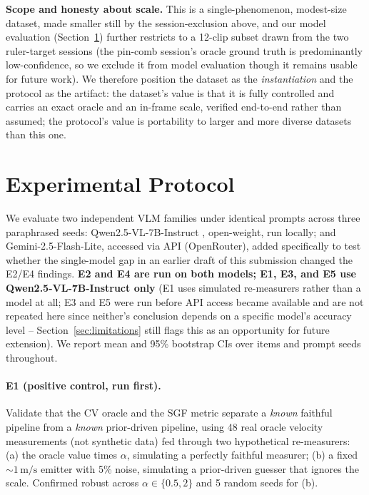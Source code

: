 \documentclass[11pt]{article}
\begin{document}
\noindent\textbf{Scope and honesty about scale.} This is a single-phenomenon,
modest-size dataset, made smaller still by the session-exclusion above, and our
model evaluation (Section~\ref{sec:exp}) further restricts to a 12-clip subset
drawn from the two ruler-target sessions (the pin-comb session's oracle ground
truth is predominantly low-confidence, so we exclude it from model evaluation
though it remains usable for future work). We therefore position the dataset as
the \emph{instantiation} and the protocol as the artifact: the dataset's value is
that it is fully controlled and carries an exact oracle and an in-frame scale,
verified end-to-end rather than assumed; the protocol's value is portability to
larger and more diverse datasets than this one.

\section{Experimental Protocol}
\label{sec:exp}
We evaluate two independent VLM families under identical prompts across three
paraphrased seeds: Qwen2.5-VL-7B-Instruct \citep{bai2025qwen25vl}, open-weight,
run locally; and Gemini-2.5-Flash-Lite, accessed via API (OpenRouter), added
specifically to test whether the single-model gap in an earlier draft of this
submission changed the E2/E4 findings. \textbf{E2 and E4 are run on both
models; E1, E3, and E5 use Qwen2.5-VL-7B-Instruct only} (E1 uses simulated
re-measurers rather than a model at all; E3 and E5 were run before API access
became available and are not repeated here since neither's conclusion depends
on a specific model's accuracy level -- Section~\ref{sec:limitations} still
flags this as an opportunity for future extension). We report mean and 95\%
bootstrap CIs over items and prompt seeds throughout.

\paragraph{E1 (positive control, run first).} Validate that the CV oracle and
the SGF metric separate a \emph{known} faithful pipeline from a \emph{known}
prior-driven pipeline, using 48 real oracle velocity measurements (not
synthetic data) fed through two hypothetical re-measurers: (a) the oracle value
times $\alpha$, simulating a perfectly faithful measurer; (b) a fixed $\sim\!1\,
\mathrm{m/s}$ emitter with 5\% noise, simulating a prior-driven guesser that
ignores the scale. Confirmed robust across $\alpha\in\{0.5,2\}$ and 5 random
seeds for (b).
\end{document}
